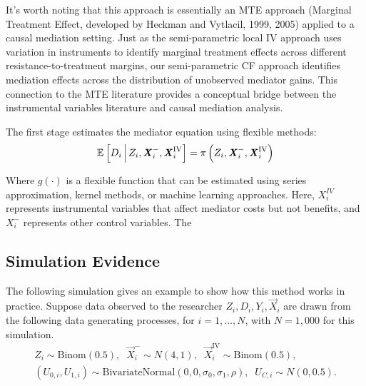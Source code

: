 It's worth noting that this approach is essentially an MTE approach (Marginal Treatment Effect, developed by Heckman and Vytlacil, 1999, 2005) applied to a causal mediation setting. Just as the semi-parametric local IV approach uses variation in instruments to identify marginal treatment effects across different resistance-to-treatment margins, our semi-parametric CF approach identifies mediation effects across the distribution of unobserved mediator gains. This connection to the MTE literature provides a conceptual bridge between the instrumental variables literature and causal mediation analysis.

The first stage estimates the mediator equation using flexible methods:
\[ \mathbb{E}_{} \left[ D_i \, \middle\vert \, Z_i, \boldsymbol{\mathit{X}}_i^-, \boldsymbol{\mathit{X}}_i^{\text{IV}} \right]
    = \pi\left(Z_i, \boldsymbol{\mathit{X}}_i^-, \boldsymbol{\mathit{X}}_i^{\text{IV}} \right) \]

Where $g(\cdot)$ is a flexible function that can be estimated using series approximation, kernel methods, or machine learning approaches. Here, $X_i^{IV}$ represents instrumental variables that affect mediator costs but not benefits, and $X_i^{-}$ represents other control variables. The




\subsection{Simulation Evidence}
The following simulation gives an example to show how this method works in practice.
Suppose data observed to the researcher $Z_i, D_i, Y_i, \vec X_i$ are drawn from the following data generating processes, for $i = 1, \hdots, N$, with 
$N = 1,000$ for this simulation.
\begin{align*}
    Z_i \sim \text{Binom}\left(0.5 \right),
    \;\; \vec X_i^- \sim N(4, 1),
    \;\; \vec X_i^{\text{IV}} \sim \text{Binom}\left( 0.5 \right), \\
    \left( U_{0,i}, U_{1,i} \right) \sim
    \text{BivariateNormal}\left( 0, 0, \sigma_0, \sigma_1, \rho \right),
    \;\; U_{C,i} \sim N(0, 0.5).
\end{align*}

